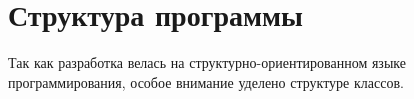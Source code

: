 


\section{Структура программы}

Так как разработка велась на структурно-ориентированном языке программирования, особое внимание уделено структуре классов.

